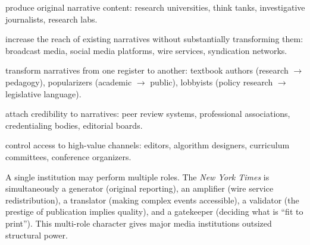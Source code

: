 \begin{definition}
\label{def:role-taxonomy}
\begin{description}[nosep]
  \item[Generators] produce original narrative content: research universities, think tanks, investigative journalists, research labs.
  \item[Amplifiers] increase the reach of existing narratives without substantially transforming them: broadcast media, social media platforms, wire services, syndication networks.
  \item[Translators] transform narratives from one register to another: textbook authors (research $\to$ pedagogy), popularizers (academic $\to$ public), lobbyists (policy research $\to$ legislative language).
  \item[Validators] attach credibility to narratives: peer review systems, professional associations, credentialing bodies, editorial boards.
  \item[Gatekeepers] control access to high-value channels: editors, algorithm designers, curriculum committees, conference organizers.
\end{description}
\end{definition}

A single institution may perform multiple roles.
The \textit{New York Times} is simultaneously a generator (original reporting), an amplifier (wire service redistribution), a translator (making complex events accessible), a validator (the prestige of publication implies quality), and a gatekeeper (deciding what is ``fit to print'').
This multi-role character gives major media institutions outsized structural power.

